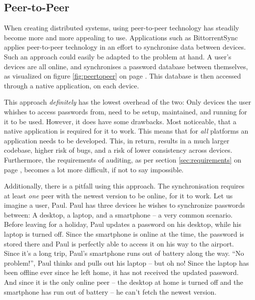 		\subsection{Peer-to-Peer}



			When creating distributed systems, using peer-to-peer technology has steadily become more and more appealing to use. Applications such as BittorrentSync applies peer-to-peer technology in an effort to synchronise data between devices. Such an approach could easily be adapted to the problem at hand. A user's devices are all online, and synchronises a password database between themselves, as visualized on figure  \ref{fig:peertopeer} on page \pageref{fig:peertopeer}. This database is then accessed through a native application, on each device. 

			This approach \emph{definitely} has the lowest overhead of the two: Only devices the user whishes to access passwords from, need to be setup, maintained, and running for it to be used. However, it does have some drawbacks. Most noticeable, that a native application is required for it to work. This means that for \emph{all} platforms an application needs to be developed. This, in return, results in a much larger codebase, higher risk of bugs, and a risk of lower consistency across devices. Furthermore, the requirements of auditing, as per section \ref{sec:requirements} on page \pageref{sec:requirements}, becomes a lot more difficult, if not to say impossible.

			Additionally, there is a pitfall using this approach. The synchronisation requires at least \emph{one} peer with the newest version to be online, for it to work. Let us imagine a user, Paul. Paul has three devices he wishes to synchronize passwords between: A desktop, a laptop, and a smartphone -- a very common scenario. Before leaving for a holiday, Paul updates a password on his desktop, while his laptop is turned off. Since the smartphone is online at the time, the password is stored there and Paul is perfectly able to access it on his way to the airport. Since it's a long trip, Paul's smartphone runs out of battery along the way. ``No problem!'', Paul thinks and pulls out his laptop -- but oh no! Since the laptop has been offline ever since he left home, it has not received the updated password. And since it is the only online peer -- the desktop at home is turned off and the smartphone has run out of battery -- he can't fetch the newest version. 

